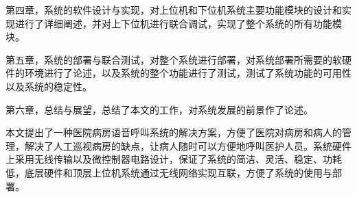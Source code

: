 第四章，系统的软件设计与实现，对上位机和下位机系统主要功能模块的设计和实现进行了详细阐述，并对上下位机进行联合调试，实现了整个系统的所有功能模块。

第五章，系统的部署与联合测试，对整个系统进行部署，对系统部署所需要的软硬件的环境进行了论述，以及系统的整个功能进行了测试，测试了系统功能的可用性以及系统的稳定性。

第六章，总结与展望，总结了本文的工作，对系统发展的前景作了论述。

本文提出了一种医院病房语音呼叫系统的解决方案，方便了医院对病房和病人的管理，解决了人工巡视病房的缺点，让病人随时可以方便地呼叫医护人员。系统硬件上采用无线传输以及微控制器电路设计，保证了系统的简洁、灵活、稳定、功耗低，底层硬件和顶层上位机系统通过无线网络实现互联，方便了系统的使用与部署。
